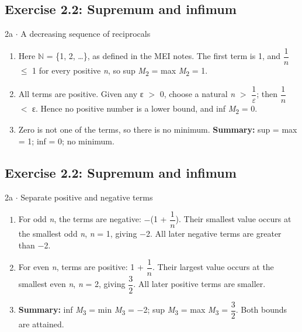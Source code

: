 \documentclass[11pt]{article}
\begin{document}
\begin{keepsection}\subsection{Exercise 2.2: Supremum and infimum}

\begin{workedbox}{2a \ensuremath{\cdot} A decreasing sequence of reciprocals}
\begin{enumerate}
\item Here \ensuremath{\mathbb{N}} = \{1, 2, …\}, as defined in the MEI notes. The first term is 1, and {\small\ensuremath{\dfrac{1}{{n}}}} \ensuremath{\leq} 1 for every positive \textit{n}, so sup \textit{M}\textsubscript{2} = max \textit{M}\textsubscript{2} = 1.
\item All terms are positive. Given any ε \ensuremath{>} 0, choose a natural \textit{n} \ensuremath{>} {\small\ensuremath{\dfrac{1}{ε}}}; then {\small\ensuremath{\dfrac{1}{{n}}}} \ensuremath{<} ε. Hence no positive number is a lower bound, and inf \textit{M}\textsubscript{2} = 0.
\item Zero is not one of the terms, so there is no minimum. \textbf{Summary:} sup = max = 1; inf = 0; no minimum.
\end{enumerate}
\end{workedbox}

\end{keepsection}
\begin{keepsection}\subsection{Exercise 2.2: Supremum and infimum}

\begin{workedbox}{2a \ensuremath{\cdot} Separate positive and negative terms}
\begin{enumerate}
\item For odd \textit{n}, the terms are negative: \ensuremath{-}(1 + {\small\ensuremath{\dfrac{1}{{n}}}}). Their smallest value occurs at the smallest odd \textit{n}, \textit{n} = 1, giving \ensuremath{-}2. All later negative terms are greater than \ensuremath{-}2.
\item For even \textit{n}, terms are positive: 1 + {\small\ensuremath{\dfrac{1}{{n}}}}. Their largest value occurs at the smallest even \textit{n}, \textit{n} = 2, giving {\small\ensuremath{\dfrac{3}{2}}}. All later positive terms are smaller.
\item \textbf{Summary:} inf \textit{M}\textsubscript{3} = min \textit{M}\textsubscript{3} = \ensuremath{-}2; sup \textit{M}\textsubscript{3} = max \textit{M}\textsubscript{3} = {\small\ensuremath{\dfrac{3}{2}}}. Both bounds are attained.
\end{enumerate}
\end{workedbox}

\end{keepsection}
\end{document}
